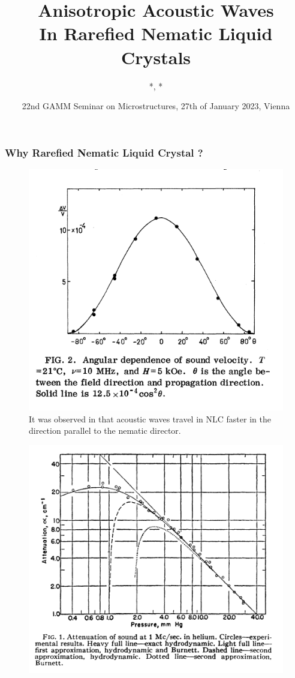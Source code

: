 \documentclass{beamer}
\title[Acoustic Rarefied Nematic Liquid Crystals]{Anisotropic Acoustic Waves \vspace{0.2cm}\\ In Rarefied Nematic Liquid Crystals} %
\author%
{%
	\sc{P. E. Farrell} *, \underline{\sc{U. Zerbinati}} *\\
}
\institute%
{%
	* \textit{Mathematical Institute}\\
	\;\textit{University of Oxford}\\
}
\date[Firedrake 2023]{22nd GAMM Seminar on Microstructures, 27th of January 2023, Vienna} %
\begin{document}
	\begin{frame}[plain]
		\titlepage
	\end{frame}
	\begin{frame}
		\frametitle{Why Rarefied Nematic Liquid Crystal ?}
		\begin{minipage}{0.49\textwidth}
			\vspace{0.8cm}
			\begin{figure}
				\includegraphics[scale=0.25]{Figures/MullenLuthiStephen}
				\vspace{-0.4cm}
				\caption{It was observed in \cite{MullenEtAll} that acoustic waves travel in NLC faster in the direction parallel to the nematic director.}
			\end{figure}
		\end{minipage}
		\begin{minipage}{0.49\textwidth}
			\vspace{1cm}
			\begin{figure}
				\includegraphics[scale=0.25]{Figures/Greenspan}

\end{figure}
\end{minipage}
\end{frame}
\end{document}
